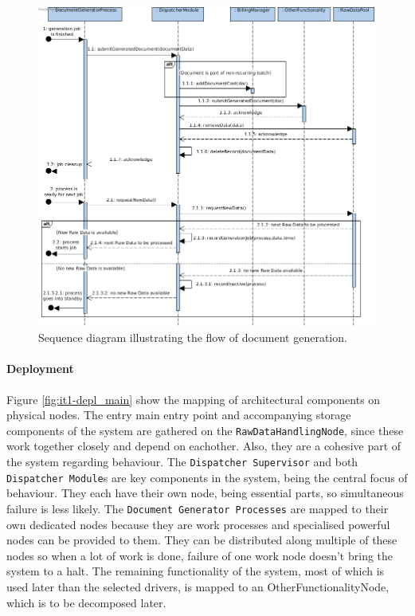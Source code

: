 \documentclass[a4paper,10pt]{article}
\begin{document}
\begin{figure}[!htp]
    \centering
    \includegraphics[width=\textwidth]{seq_diag_1_-_doc_gen.png}
    \caption{Sequence diagram illustrating the flow of document generation.}\label{fig:it1-seq_aspect1}
\end{figure}

\paragraph{Deployment}
Figure \ref{fig:it1-depl_main} show the mapping of architectural components on physical nodes.
The entry main entry point and accompanying storage components of the system are gathered on the \texttt{RawDataHandlingNode}, since these work together closely and depend on eachother. Also, they are a cohesive part of the system regarding behaviour. The \texttt{Dispatcher Supervisor} and both \texttt{Dispatcher Module}s are key components in the system, being the central focus of behaviour. They each have their own node, being essential parts, so simultaneous failure is less likely. The \texttt{Document Generator Processes} are mapped to their own dedicated nodes because they are work processes and specialised powerful nodes can be provided to them. They can be distributed along multiple of these nodes so when a lot of work is done, failure of one work node doesn't bring the system to a halt. The remaining functionality of the system, most of which is used later than the selected drivers, is mapped to an OtherFunctionalityNode, which is to be decomposed later.
\end{document}
